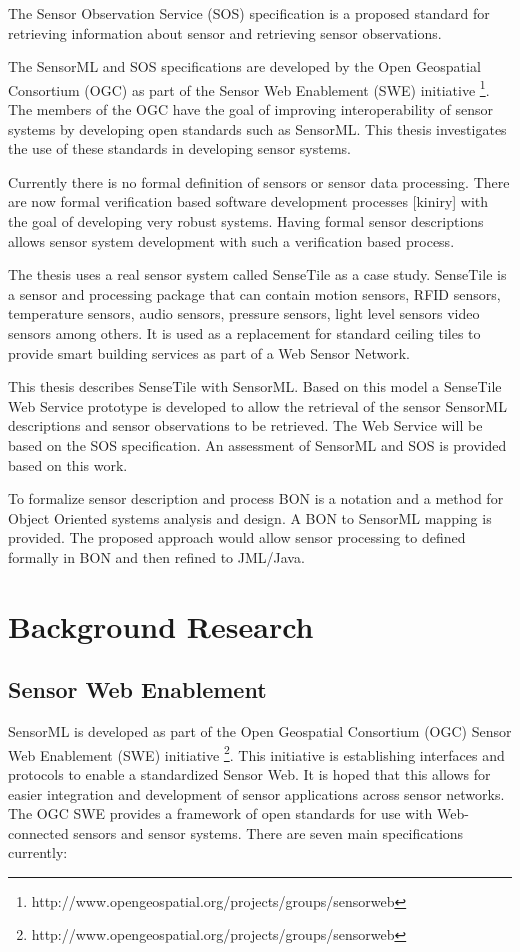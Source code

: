 \documentclass[]{final_report}
\begin{document}
The Sensor Observation Service (SOS)\cite{SOSref}  specification is a proposed standard for retrieving information about sensor and retrieving sensor observations. 

The SensorML and SOS specifications are developed by the Open Geospatial Consortium (OGC) as part of the Sensor Web Enablement (SWE) initiative \footnote{http://www.opengeospatial.org/projects/groups/sensorweb}. The members of the OGC have the goal of improving interoperability of sensor systems by developing open standards such as SensorML. This thesis investigates the use of these standards in developing sensor systems.

Currently there is no formal definition of sensors or sensor data processing. There are now formal verification based software development processes [kiniry] with the goal of developing very robust systems. Having formal sensor descriptions allows sensor system development with such a verification based process.

The thesis uses a real sensor system called SenseTile as a case study. SenseTile is a sensor and processing package that can contain motion sensors, RFID sensors, temperature sensors, audio sensors, pressure sensors, light level sensors video sensors among others. It is used as a replacement for standard ceiling tiles to provide smart building services as part of a Web Sensor Network.

This thesis describes SenseTile with SensorML. Based on this model a SenseTile Web Service prototype is developed to allow the retrieval of the sensor SensorML descriptions and sensor observations to be retrieved. The Web Service will be based on the SOS specification. An assessment of SensorML and SOS is provided based on this work.

To formalize sensor description and process BON\cite{BONref} is a notation and a method for Object Oriented systems analysis and design. A BON to SensorML mapping is provided. The proposed approach would allow sensor processing to defined formally in BON and then refined to JML/Java.


\chapter{ Background Research}

\section{Sensor Web Enablement}
SensorML is developed as part of the Open Geospatial Consortium (OGC) Sensor Web Enablement (SWE) initiative \footnote{http://www.opengeospatial.org/projects/groups/sensorweb}. This initiative is establishing interfaces and protocols to enable a standardized Sensor Web. It is hoped that this allows for easier integration and development of sensor applications across sensor networks. The OGC SWE provides a framework of open standards for use with Web-connected sensors and sensor systems. There are seven main specifications currently:
\end{document}

